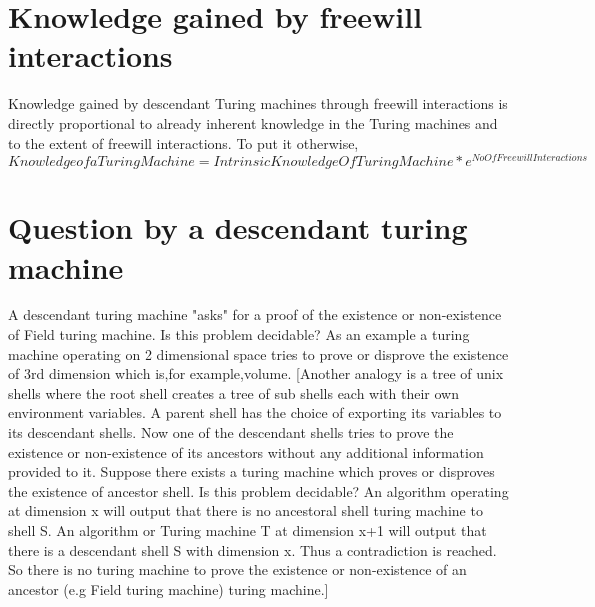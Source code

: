 \documentclass[11pt,onecolumn]{article}
\begin{document}
\section {Knowledge gained by freewill interactions}
Knowledge gained by descendant Turing machines through freewill interactions is directly proportional to already inherent knowledge in the Turing machines and to the extent of freewill interactions. To put it otherwise, $Knowledge of a TuringMachine = {IntrinsicKnowledgeOfTuringMachine}*e^{NoOfFreewillInteractions}$
\section{Question by a descendant turing machine}
A descendant turing machine "asks" for a proof of the existence or non-existence of Field turing machine. Is this problem decidable? As an example a turing machine operating on 2 dimensional space tries to prove or disprove the existence of 3rd dimension which is,for example,volume. [Another analogy is a tree of unix shells where the root shell creates a tree of sub shells each with their own environment variables. A parent shell has the choice of exporting its variables to its descendant shells. Now one of the descendant shells tries to prove the existence or non-existence of its ancestors without any additional information provided to it. Suppose there exists a turing machine which proves or disproves the existence of ancestor shell. Is this problem decidable? An algorithm operating at dimension x will output that there is no ancestoral shell turing machine to shell S. An algorithm or Turing machine T at dimension x+1 will output that there is a descendant shell S with dimension x. Thus a contradiction is reached. So there is no turing machine to prove the existence or non-existence of an ancestor (e.g Field turing machine) turing machine.]
\end{document}
